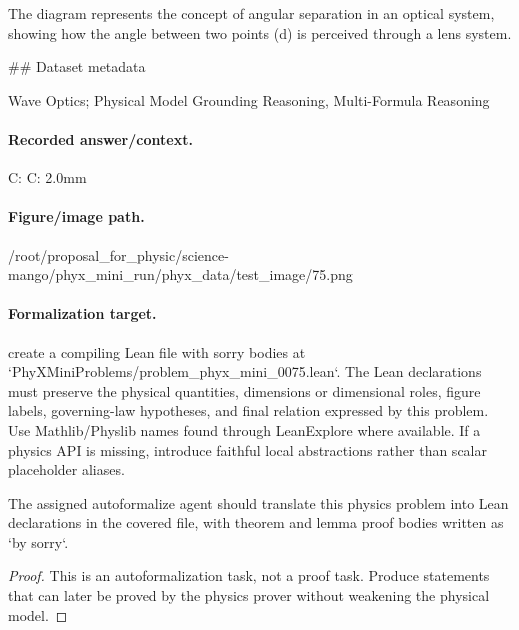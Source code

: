 The diagram represents the concept of angular separation in an optical system, showing how the angle between two points (d) is perceived through a lens system.

\#\# Dataset metadata

Wave Optics; Physical Model Grounding Reasoning, Multi-Formula Reasoning

\paragraph{Recorded answer/context.}
C: C: 2.0mm

\paragraph{Figure/image path.}
/root/proposal\_for\_physic/science-mango/phyx\_mini\_run/phyx\_data/test\_image/75.png

\paragraph{Formalization target.}
create a compiling Lean file with sorry bodies at `PhyXMiniProblems/problem\_phyx\_mini\_0075.lean`. The Lean declarations must preserve the physical quantities, dimensions or dimensional roles, figure labels, governing-law hypotheses, and final relation expressed by this problem.
Use Mathlib/Physlib names found through LeanExplore where available. If a physics API is missing, introduce faithful local abstractions rather than scalar placeholder aliases.

\begin{theorem}
\label{thm:physics:phyx_mini_0075:target}
The assigned autoformalize agent should translate this physics problem into Lean declarations in the covered file, with theorem and lemma proof bodies written as `by sorry`.
\end{theorem}
\begin{proof}
This is an autoformalization task, not a proof task. Produce statements that can later be proved by the physics prover without weakening the physical model.
\end{proof}

